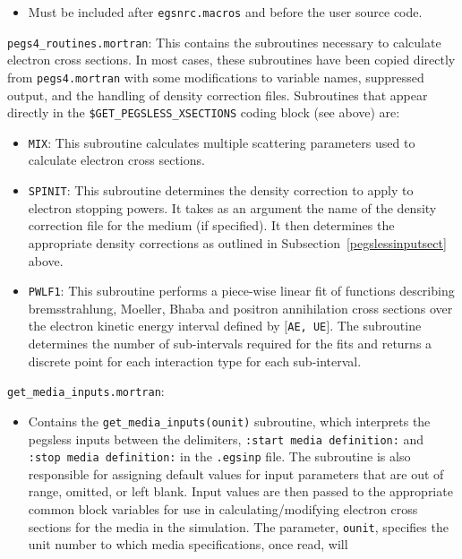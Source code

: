 \begin{description}
\begin{itemize}
\item Must be included after {\tt egsnrc.macros} and before the user source code.
\end{itemize}
\item{\tt pegs4\_routines.mortran}:  This contains the subroutines necessary to calculate electron cross sections.  In most
cases, these subroutines have been copied directly from {\tt pegs4.mortran} with some modifications to variable names, suppressed
output, and the handling of density correction files.  Subroutines that appear directly in the {\tt \$GET\_PEGSLESS\_XSECTIONS}
coding block (see above) are:
\begin{itemize}
\item {\tt MIX}: This subroutine calculates multiple scattering parameters used to calculate electron cross sections.
\item {\tt SPINIT}: This subroutine determines the density correction to apply to electron stopping powers.  It takes as
an argument the name of the density correction file for the medium (if specified).  It then determines the appropriate
density corrections as outlined in Subsection~\ref{pegslessinputsect} above.
\item {\tt PWLF1}: This subroutine performs a piece-wise linear fit of functions describing bremsstrahlung, Moeller, Bhaba
and positron annihilation cross sections over the electron kinetic energy interval defined by $[${\tt AE, UE}$]$.  The subroutine
determines the number of sub-intervals required for the fits and returns a discrete point for each interaction type for
each sub-interval.
\end{itemize}
\item {\tt get\_media\_inputs.mortran}:
\begin{itemize}
\item Contains the {\tt get\_media\_inputs(ounit)} subroutine, which interprets
the pegsless inputs between the delimiters, {\tt :start media definition:} and {\tt :stop media definition:}
in the {\tt .egsinp} file.  The subroutine is also responsible for assigning default values for input parameters
that are out of range, omitted, or left blank.  Input values are then passed to the appropriate common block
variables for use in calculating/modifying electron cross sections for the media in the simulation. The parameter,
{\tt ounit}, specifies the unit number to which media specifications, once read, will

\end{itemize}
\end{description}
